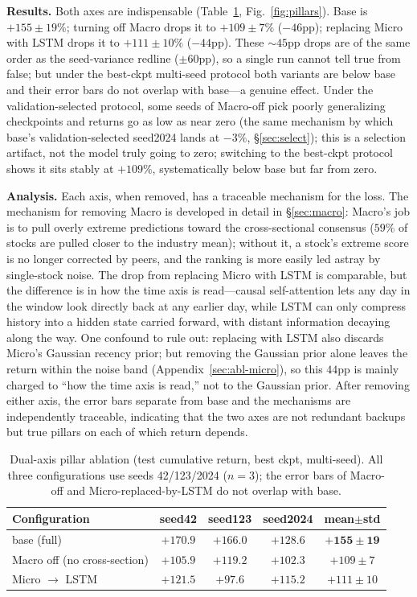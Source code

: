 \documentclass[a4paper,11pt]{article}
\begin{document}
\textbf{Results.} Both axes are indispensable (Table~\ref{tab:pillars},
Fig.~\ref{fig:pillars}). Base is $+155\pm19\%$; turning off Macro drops it to
$+109\pm7\%$ ($-46$pp); replacing Micro with LSTM drops it to $+111\pm10\%$
($-44$pp). These $\sim 45$pp drops are of the same order as the seed-variance
redline ($\pm60$pp), so a single run cannot tell true from false; but under the
best-ckpt multi-seed protocol both variants are below base and their error bars
do not overlap with base---a genuine effect. Under the validation-selected
protocol, some seeds of Macro-off pick poorly generalizing checkpoints and
returns go as low as near zero (the same mechanism by which base's
validation-selected seed2024 lands at $-3\%$, \S\ref{sec:select}); this is a
selection artifact, not the model truly going to zero; switching to the
best-ckpt protocol shows it sits stably at $+109\%$, systematically below base
but far from zero.

\textbf{Analysis.} Each axis, when removed, has a traceable mechanism
for the loss. The mechanism for removing Macro is developed in detail in
\S\ref{sec:macro}: Macro's job is to pull overly extreme predictions toward the
cross-sectional consensus ($59\%$ of stocks are pulled closer to the industry
mean); without it, a stock's extreme score is no longer corrected by peers, and
the ranking is more easily led astray by single-stock noise. The drop from
replacing Micro with LSTM is comparable, but the difference is in how the time
axis is read---causal self-attention lets any day in the window look directly
back at any earlier day, while LSTM can only compress history into a hidden
state carried forward, with distant information decaying along the way. One
confound to rule out: replacing with LSTM also discards Micro's Gaussian
recency prior; but removing the Gaussian prior alone leaves the return within
the noise band (Appendix~\ref{sec:abl-micro}), so this $44$pp is mainly charged
to ``how the time axis is read,'' not to the Gaussian prior. After removing
either axis, the error bars separate from base and the mechanisms are
independently traceable, indicating that the two axes are not redundant backups
but true pillars on each of which return depends.

\begin{table}[H]
\centering
\caption{Dual-axis pillar ablation (test cumulative return, best ckpt,
multi-seed). All three configurations use seeds 42/123/2024 ($n{=}3$); the
error bars of Macro-off and Micro-replaced-by-LSTM do not overlap with base.}
\label{tab:pillars}
\begin{tabular}{lcccc}
\toprule
Configuration & seed42 & seed123 & seed2024 & mean$\pm$std \\
\midrule
base (full)              & $+170.9$ & $+166.0$ & $+128.6$ & $\mathbf{+155\pm19}$ \\
Macro off (no cross-section) & $+105.9$ & $+119.2$ & $+102.3$ & $+109\pm7$ \\
Micro $\to$ LSTM         & $+121.5$ & $+97.6$  & $+115.2$ & $+111\pm10$ \\
\bottomrule
\end{tabular}
\end{table}
\end{document}
